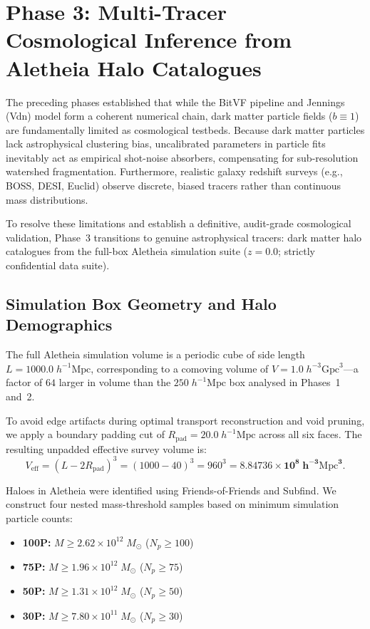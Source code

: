 \documentclass[12pt]{report}
\begin{document}
\section{Phase 3: Multi-Tracer Cosmological Inference from Aletheia Halo Catalogues}
\label{sec:phase3_halos}

The preceding phases established that while the BitVF pipeline and Jennings (Vdn) model form a coherent numerical chain, dark matter particle fields ($b \equiv 1$) are fundamentally limited as cosmological testbeds. Because dark matter particles lack astrophysical clustering bias, uncalibrated parameters in particle fits inevitably act as empirical shot-noise absorbers, compensating for sub-resolution watershed fragmentation. Furthermore, realistic galaxy redshift surveys (e.g., BOSS, DESI, Euclid) observe discrete, biased tracers rather than continuous mass distributions.

To resolve these limitations and establish a definitive, audit-grade cosmological validation, Phase~3 transitions to genuine astrophysical tracers: dark matter halo catalogues from the full-box Aletheia simulation suite ($z=0.0$; strictly confidential data suite).

\subsection{Simulation Box Geometry and Halo Demographics}

The full Aletheia simulation volume is a periodic cube of side length $L = 1000.0\;h^{-1}\mathrm{Mpc}$, corresponding to a comoving volume of $V = 1.0\;h^{-3}\mathrm{Gpc}^3$---a factor of $64$ larger in volume than the $250\;h^{-1}\mathrm{Mpc}$ box analysed in Phases~1 and~2.

To avoid edge artifacts during optimal transport reconstruction and void pruning, we apply a boundary padding cut of $R_{\mathrm{pad}} = 20.0\;h^{-1}\mathrm{Mpc}$ across all six faces. The resulting unpadded effective survey volume is:
\begin{equation}
    V_{\mathrm{eff}} = (L - 2 R_{\mathrm{pad}})^3 = (1000 - 40)^3 = 960^3 = \mathbf{8.84736 \times 10^8\;h^{-3}\mathrm{Mpc}^3}.
\end{equation}

Haloes in Aletheia were identified using Friends-of-Friends and Subfind. We construct four nested mass-threshold samples based on minimum simulation particle counts:
\begin{itemize}
    \item \textbf{100P:} $M \ge 2.62 \times 10^{12}\;M_\odot$ ($N_p \ge 100$)
    \item \textbf{75P:} $M \ge 1.96 \times 10^{12}\;M_\odot$ ($N_p \ge 75$)
    \item \textbf{50P:} $M \ge 1.31 \times 10^{12}\;M_\odot$ ($N_p \ge 50$)
    \item \textbf{30P:} $M \ge 7.80 \times 10^{11}\;M_\odot$ ($N_p \ge 30$)
\end{itemize}
\end{document}

